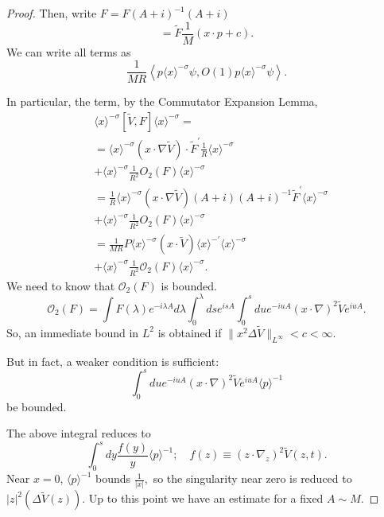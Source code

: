 \documentclass[11pt]{article}
\begin{document}
\begin{proof}
Then, write $F=F(A+i)^{-1}(A+i)$
$$
=\tilde F \frac{1}{M}(x \cdot p+c).
$$
We can write all terms as
$$
\frac{1}{M R}\left\langle p\langle x\rangle^{-\sigma} \psi, O(1) p\langle x\rangle^{-\sigma} \psi\right\rangle .
$$

In particular, the term, by the Commutator Expansion
Lemma,
$$
\begin{aligned}
& \langle x\rangle^{-\sigma}[\tilde{V}, F]\langle x\rangle^{-\sigma}= \\
& =\langle x\rangle^{-\sigma}(x \cdot \nabla \tilde{V}) \cdot \tilde{F}^{\prime} \frac{1}{R}\langle x\rangle^{-\sigma} \\
& +\langle x\rangle^{-\sigma} \frac{1}{R^{2}} O_{2}(F)\langle x\rangle^{-\sigma} \\
& =\frac{1}{R}\langle x\rangle^{-\sigma}(x \cdot \nabla \tilde{V})(A+i)(A+i)^{-1} \tilde{F}^{\prime}\langle x\rangle^{-\sigma} \\
& +\langle x\rangle^{-\sigma} \frac{1}{R^{2}} O_{2}(F)\langle x\rangle^{-\sigma} \\
& =\frac{1}{M R} P\langle x\rangle^{-\sigma}(x \cdot \tilde{V})\langle x\rangle^{-\prime}\langle x\rangle^{-\sigma} \\
& +\langle x\rangle^{-\sigma} \frac{1}{R^{2}} \mathcal{O}_{2}(F)\langle x\rangle^{-\sigma} .
\end{aligned}
$$
We need to know that $\mathcal{O}_2(F)$ is bounded.
\begin{equation}
\mathcal{O}_2(F)=\int{\hat F(\lambda)}e^{-i\lambda A}d \lambda \int_0^\lambda ds e^{isA} \int_0^sdu e^{-iuA}(x\cdot \nabla)^2\tilde Ve^{iuA}. 
\end{equation}
So, an immediate bound in $L^2$ is obtained if $\|x^2\Delta \tilde V \|_{L^{\infty}}<c<\infty.$

But in fact, a weaker condition is sufficient:
\begin{equation}
  \int_0^sdu e^{-iuA}(x\cdot \nabla)^2\tilde Ve^{iuA}\langle p\rangle^{-1}    
\end{equation}
be bounded.

The above integral reduces to 
\begin{equation}
\int_0^sdy \frac{f(y)}{y}\langle p\rangle^{-1}; \quad f(z)\equiv (z\cdot \nabla_z)^2\tilde V(z,t).    
\end{equation}
 Near $x=0$, $\langle p\rangle^{-1}$ bounds $\frac{1}{|x|},$
 so the singularity near zero is reduced to $|z|^2(\Delta \tilde V(z)).$
 Up to this point we have an estimate for a fixed $A\sim M.$

 


\end{proof}
\end{document}
